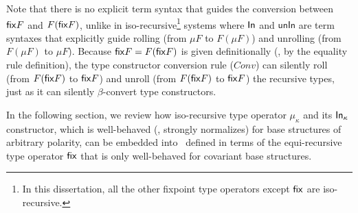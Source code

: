 Note that there is no explicit term syntax that guides the conversion between
$\mathsf{fix} F$ and $F(\mathsf{fix} F)$, unlike in iso-recursive\footnote{
	In this dissertation, all the other fixpoint type operators
	except $\mathsf{fix}$ are iso-recursive.}
systems where $\mathsf{In}$ and $\mathsf{unIn}$ are term syntaxes that explicitly guide
rolling (from $\mu F$ to $F(\mu F)$) and unrolling (from $F(\mu F)$ to $\mu F$).
Because $\mathsf{fix} F=F(\mathsf{fix} F)$ is given definitionally (\ie, by the equality rule
definition), the type constructor conversion rule ($Conv$) can silently
roll (from $F(\mathsf{fix} F)$ to $\mathsf{fix} F$) and unroll (from $F(\mathsf{fix} F)$ to $\mathsf{fix} F$)
the recursive types, just as it can silently $\beta$-convert type constructors.

In the following section, we review how iso-recursive type operator
$\mu_\kappa$ and its $\mathsf{In}_\kappa$ constructor, which is well-behaved
(\ie, strongly normalizes) for base structures of arbitrary polarity,
can be embedded into \Fixi\ defined in terms of the equi-recursive
type operator $\mathsf{fix}$ that is only well-behaved for covariant base structures.

